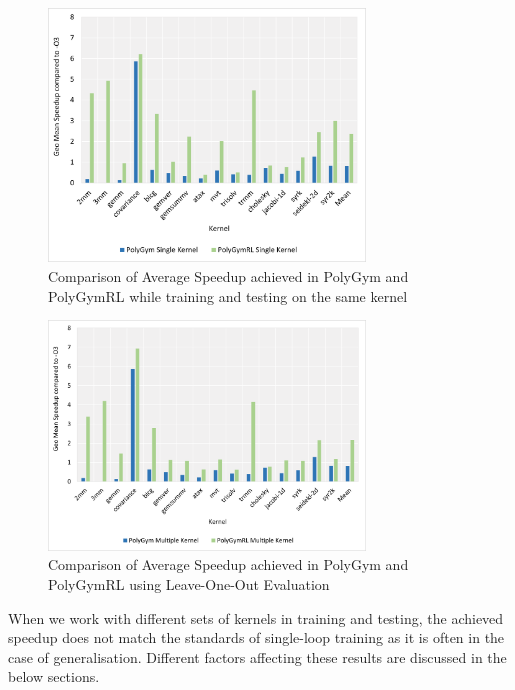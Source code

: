 \documentclass[logo,msc]{infthesis}           %
\begin{document}
\begin{figure}[htbp]
  \centering
  \includegraphics[width=0.75\textwidth]{Images/Chart_Single_PolyGym_PolyGymRL.png}    
  \caption{Comparison of Average Speedup achieved in PolyGym and PolyGymRL while training and testing on the same kernel}
  \label{fig:single_PolyGym_PolyGymRL}
\end{figure}

\begin{figure}[htbp]
  \centering
  \includegraphics[width=0.75\textwidth]{Images/Chart_Multiple_PolyGym_PolyGymRL.png}    
  \caption{Comparison of Average Speedup achieved in PolyGym and PolyGymRL using Leave-One-Out Evaluation}
  \label{fig:multi_PolyGym_PolyGymRL}
\end{figure}
 
When we work with different sets of kernels in training and testing, the achieved speedup does not match the standards of single-loop training as it is often in the case of generalisation. Different factors affecting these results are discussed in the below sections.
\end{document}
